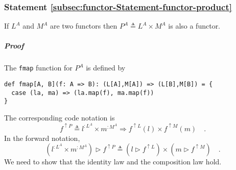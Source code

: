 \subsubsection{Statement \label{subsec:functor-Statement-functor-product}\ref{subsec:functor-Statement-functor-product}}

If $L^{A}$ and $M^{A}$ are two functors then $P^{A}\triangleq L^{A}\times M^{A}$
is also a functor.

\subparagraph{Proof}

The \lstinline!fmap! function for $P^{A}$ is defined by
\begin{lstlisting}
def fmap[A, B](f: A => B): (L[A],M[A]) => (L[B],M[B]) = {
  case (la, ma) => (la.map(f), ma.map(f))
}
\end{lstlisting}
The corresponding code notation is
\[
f^{\uparrow P}\triangleq l^{:L^{A}}\times m^{:M^{A}}\Rightarrow f^{\uparrow L}(l)\times f^{\uparrow M}(m)\quad.
\]
In the forward notation,
\begin{equation}
(l^{:L^{A}}\times m^{:M^{A}})\triangleright f^{\uparrow P}\triangleq(l\triangleright f^{\uparrow L})\times(m\triangleright f^{\uparrow M})\quad.\label{eq:f-def-of-functor-product-lift}
\end{equation}
We need to show that the identity law and the composition law hold.

